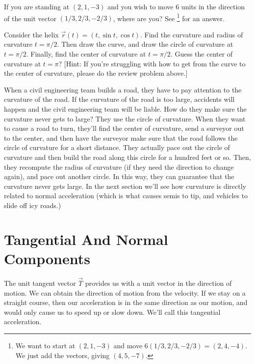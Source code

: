 \begin{review*}
 If you are standing at $(2,1,-3)$ and you wish to move 6 units in the direction of the unit vector $(1/3, 2/3, -2/3)$, where are you? See \footnote{We want to start at $(2,1,-3)$ and move $6(1/3, 2/3, -2/3) = (2,4,-4)$. We just add the vectors, giving $(4,5,-7)$.} for an answer.	
\end{review*}

\begin{problem}%
 Consider the helix $\vec r(t)=(t,\sin t,\cos t)$. Find the curvature and radius of curvature $t=\pi/2$. Then draw the curve, and draw the circle of curvature at $t=\pi/2$. Finally, find the center of curvature at $t=\pi/2$. Guess the center of curvature at $t=\pi$? [Hint: If you're struggling with how to get from the curve to the center of curvature, please do the review problem above.]
\end{problem}

When a civil engineering team builds a road, they have to pay attention to the curvature of the road.  If the curvature of the road is too large, accidents will happen and the civil engineering team will be liable. How do they make sure the curvature never gets to large?  They use the circle of curvature. When they want to cause a road to turn, they'll find the center of curvature, send a surveyor out to the center, and then have the surveyor make sure that the road follows the circle of curvature for a short distance. They actually pace out the circle of curvature and then build the road along this circle for a hundred feet or so.  Then, they recompute the radius of curvature (if they need the direction to change again), and pace out another circle.  In this way, they can guarantee that the curvature never gets large. In the next section we'll see how curvature is directly related to normal acceleration (which is what causes semis to tip, and vehicles to slide off icy roads.)





\section{Tangential And Normal Components}

The unit tangent vector $\vec T$ provides us with a unit vector in the direction of motion. We can obtain the direction of motion from the velocity. If we stay on a straight course, then our acceleration is in the same direction as our motion, and would only cause us to speed up or slow down. We'll call this tangential acceleration.

